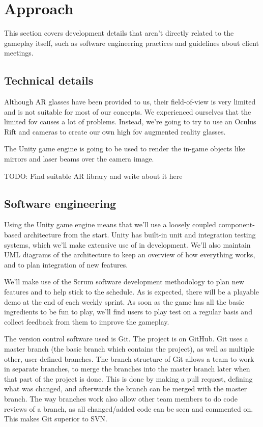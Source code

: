 \section{Approach}

This section covers development details that aren't directly related to the
gameplay itself, such as software engineering practices and guidelines about
client meetings.

\subsection{Technical details}

Although AR glasses have been provided to us, their field-of-view is very
limited and is not suitable for most of our concepts. We experienced ourselves
that the limited fov causes a lot of problems. Instead, we're going to try to
use an Oculus Rift and cameras to create our own high fov augmented reality
glasses.

The Unity game engine is going to be used to render the in-game objects like
mirrors and laser beams over the camera image.

{\color{red} TODO: Find suitable AR library and write about it here}

\subsection{Software engineering}

Using the Unity game engine means that we'll use a loosely coupled
component-based architecture from the start. Unity has built-in unit and
integration testing systems, which we'll make extensive use of in development.
We'll also maintain UML diagrams of the architecture to keep an overview of how
everything works, and to plan integration of new features.

We'll make use of the Scrum software development methodology to plan new
features and to help stick to the schedule. As is expected, there will be a
playable demo at the end of each weekly sprint. As soon as the game has all the
basic ingredients to be fun to play, we'll find users to play test on a regular
basis and collect feedback from them to improve the gameplay.

The version control software used is Git. The project is on GitHub. Git uses a master branch (the 
basic branch which contains the project), as well as multiple other, user-defined branches.
The branch structure of Git allows a team to work in separate branches, to merge the branches 
into the master branch later when that part of the project is done. This is done by making 
a pull request, defining what was changed, and afterwards the branch can be merged with the master branch.
The way branches work also allow other team members to do code reviews of a branch, as all changed/added
code can be seen and commented on. This makes Git superior to SVN.

